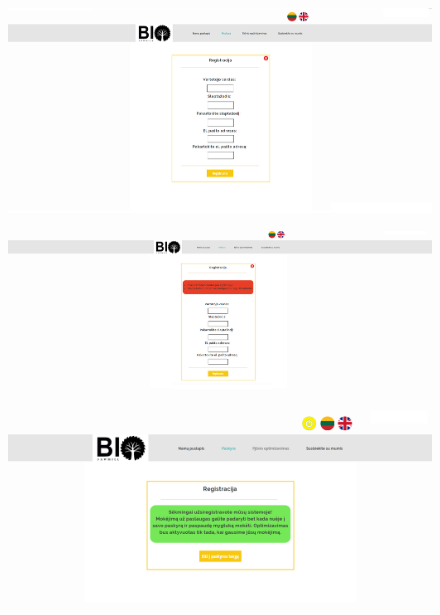 \documentclass[a4paper,12pt]{article}
\begin{document}
\begin{figure}[!tph]
\hspace{-3cm}
\centering
\includegraphics[scale=0.5]{interfeisai/paskyrosPuslapisRegistracija}
\label{fig:verticalcell}
\end{figure}

\begin{figure}[!tph]
\hspace{-3cm}
\centering
\includegraphics[scale=0.5]{interfeisai/paskyrosPuslapisRegistracijaSuKlaida}
\label{fig:verticalcell}
\end{figure}

\begin{figure}[!tph]
\hspace{-3cm}
\centering
\includegraphics[scale=0.5]{interfeisai/paskyrosPuslapisRegistracijaSekminga}
\label{fig:verticalcell}
\end{figure}
 
\end{document}
